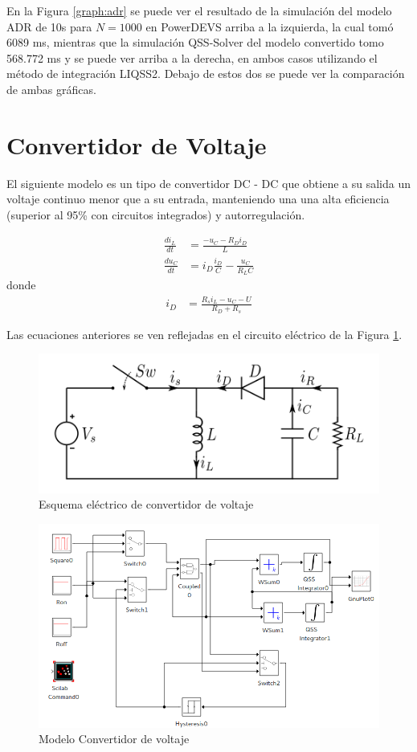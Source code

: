 En la Figura \ref{graph:adr} se puede ver el resultado de la simulación del modelo ADR de 10s para $N=1000$ en PowerDEVS arriba a la izquierda, la cual tomó 6089 ms,
mientras que la simulación QSS-Solver del modelo convertido tomo 568.772 ms y se puede ver arriba a la derecha, en ambos casos utilizando el método de integración LIQSS2. Debajo de estos dos se puede ver la comparación de ambas gráficas.

\section{Convertidor de Voltaje}
	El siguiente modelo es un tipo de convertidor DC - DC que obtiene a su  salida  un  voltaje  continuo  menor  que  a  su entrada, manteniendo una una  alta eficiencia (superior al 95\% con circuitos integrados) y autorregulación.

\begin{align*}
\frac{di_{L}}{dt} & = \frac{-u_{C} - R_D i_D }{L}\\
\frac{du_C}{dt} & =i_D \frac{i_D}{C} - \frac{u_C}{R_L C }
\end{align*}
donde
\begin{align*}
i_D & = \frac{R_s i_L - u_C - U }{R_D + R_s}
\end{align*}

Las ecuaciones anteriores se ven reflejadas en el circuito eléctrico de la Figura \ref{buckdisk-squema}.

\begin{figure}[H]
\centering
 \includegraphics[width=.60\linewidth]{Buckboost_conventions}
 \caption{Esquema eléctrico de convertidor de voltaje}\label{buckdisk-squema}
\end{figure}


\begin{figure}[H]
\includegraphics[width=0.75\linewidth]{buck_disk}
\caption{Modelo Convertidor de voltaje}\label{model:buckdisk}
\end{figure}


